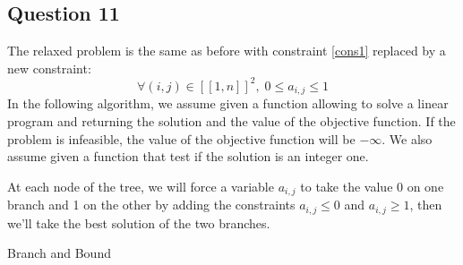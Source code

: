 \documentclass[english]{article}
\begin{document}
\subsection*{Question 11}

The relaxed problem is the same as before with constraint \ref{cons1} replaced by a new constraint:
\begin{equation}\label{cons6}
    \forall (i, j) \in {[\![1, n]\!]}^2, \; 0 \leq a_{i,j} \leq 1
\end{equation}
In the following algorithm, we assume given a function allowing to solve a linear program and returning the solution and the value of the objective function. If the problem is infeasible, the value of the objective function will be $ - \infty $. We also assume given a function that test if the solution is an integer one. 

At each node of the tree, we will force a variable $ a_{i, j} $ to take the value 0 on one branch and 1 on the other by adding the constraints $ a_{i, j} \leq 0 $ and $ a_{i, j} \geq 1 $, then we'll take the best solution of the two branches.
\begin{algorithm}

    \caption{Branch and Bound}
    


    
\end{algorithm}
\end{document}
